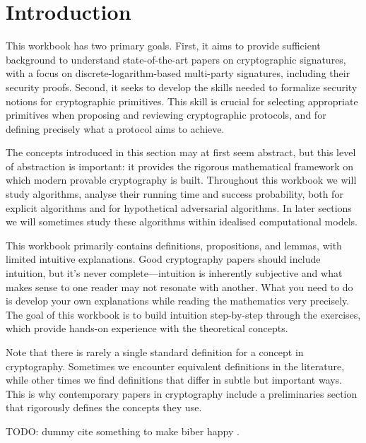 \section{Introduction}\label{sec:intro}

This workbook has two primary goals.
First, it aims to provide sufficient background to understand state-of-the-art papers on cryptographic signatures, with a focus on discrete-logarithm-based multi-party signatures, including their security proofs.
Second, it seeks to develop the skills needed to formalize security notions for cryptographic primitives.
This skill is crucial for selecting appropriate primitives when proposing and reviewing cryptographic protocols, and for defining precisely what a protocol aims to achieve.

The concepts introduced in this section may at first seem abstract, but this level of abstraction is important: it provides the rigorous mathematical framework on which modern provable cryptography is built.
Throughout this workbook we will study algorithms, analyse their running time and success probability, both for explicit algorithms and for hypothetical adversarial algorithms.
In later sections we will sometimes study these algorithms within idealised computational models.

This workbook primarily contains definitions, propositions, and lemmas, with limited intuitive explanations.
Good cryptography papers should include intuition, but it's never complete---intuition is inherently subjective and what makes sense to one reader may not resonate with another.
What you need to do is develop your own explanations while reading the mathematics very precisely.
The goal of this workbook is to build intuition step-by-step through the exercises, which provide hands-on experience with the theoretical concepts.

Note that there is rarely a single standard definition for a concept in cryptography.
Sometimes we encounter equivalent definitions in the literature, while other times we find definitions that differ in subtle but important ways.
This is why contemporary papers in cryptography include a preliminaries section that rigorously defines the concepts they use.


TODO: dummy cite something to make biber happy \textcite{EPRINT:NicRufSeu20}.

